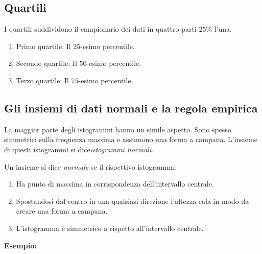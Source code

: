 \documentclass{article}
\begin{document}
\subsection*{Quartili}

I quartili suddividono il campionario dei dati in quattro parti $25\%$ l'una.

\begin{enumerate}
  \item Primo quartile: Il $25$-esimo percentile.
  \item Secondo quartile: Il $50$-esimo percentile.
  \item Terzo quartile: Il $75$-esimo percentile.
\end{enumerate}

\subsection*{Gli insiemi di dati normali e la regola empirica}

La maggior parte degli istogrammi hanno un simile aspetto. Sono spesso simmetrici sulla frequenza massima e assumono una forma a campana. L'insieme di questi istogrammi si dice\textit{istogrammi normali}.  

\begin{tcolorbox}
Un insieme si dice \textit{normale} se il rispettivo istogramma:
\begin{enumerate}
  \item Ha punto di massima in corrispondenza dell'intervallo centrale.
  \item Spostandosi dal centro in una qualsiasi direzione l'altezza cala in modo da creare una forma a campana.
  \item L'istogramma è simmetrico a rispetto all'intervallo centrale.
\end{enumerate}
 
  \textbf{Esempio:} 


\end{tcolorbox}
\end{document}
